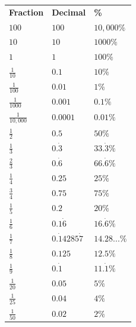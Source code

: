 \documentclass[9pt]{article}
\begin{document}
\vspace{1pt}
\noindent
\begin{minipage}[t]{0.18\linewidth}
\vspace{0pt}
\noindent\colorbox{TitleBg}{}
\par\vspace{2pt}
\renewcommand{\arraystretch}{2.0}
{\scriptsize\setlength{\tabcolsep}{2pt}
\begin{tabular}{
  >{\bfseries\centering\arraybackslash}p{1.1cm}
  >{\bfseries\centering\arraybackslash}p{1.1cm}
  >{\bfseries\centering\arraybackslash}p{1.1cm}
}
\rowcolor{RowAlt}
Fraction & Decimal & \% \\
$100$  & $100$       & $10,000\%$         \\
$10$  & $10$       & $1000\%$         \\
$1$  & $1$       & $100\%$         \\
$\tfrac{1}{10}$  & $0.1$      & $10\%$         \\
$\tfrac{1}{100}$  & $0.01$      & $1\%$         \\
$\tfrac{1}{1000}$  & $0.001$       & $0.1\%$         \\
$\tfrac{1}{10,000}$  & $0.0001$       & $0.01\%$         \\
$\tfrac{1}{2}$  & $0.5$       & $50\%$         \\
$\tfrac{1}{3}$  & $0.\dot{3}$       & $33.\dot{3}\%$         \\
$\tfrac{2}{3}$  & $0.\dot{6}$       & $66.\dot{6}\%$         \\
$\tfrac{1}{4}$  & $0.25$       & $25\%$         \\
$\tfrac{3}{4}$  & $0.75$     & $75\%$       \\
$\tfrac{1}{5}$  & $0.2$     & $20\%$       \\
$\tfrac{1}{6}$  & $0.1\dot{6}$     & $16.\dot{6}\%$       \\
$\tfrac{1}{7}$  & $0.\dot{1}4285\dot{7}$     & $14.28...\%$       \\
$\tfrac{1}{8}$  & $0.125$ & $12.5\%$ \\
$\tfrac{1}{9}$  & $0.\dot{1}$ & $11.\dot{1}\%$ \\
$\tfrac{1}{20}$  & $0.05$ & $5\%$ \\
$\tfrac{1}{25}$  & $0.04$ & $4\%$ \\
$\tfrac{1}{50}$  & $0.02$ & $2\%$ \\
\end{tabular}
}
\end{minipage}\hfill
\end{document}
